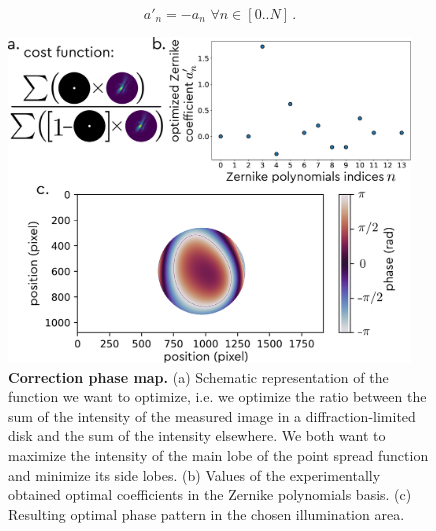 \documentclass[12pt]{iopart}
\begin{document}
\begin{equation}
  a'_n = -a_n \,\, \forall n \in [0..N]\, .
\end{equation}

\begin{figure}
  \centering
  \includegraphics[width = 0.95\textwidth]{images/Zernike_1.pdf}
  \caption{
    \textbf{Correction phase map.}
    (a) Schematic representation of the function we want to optimize, 
    i.e. we optimize the ratio between 
    the sum of the intensity of the measured image in a diffraction-limited disk
    and the sum of the intensity elsewhere.    
    We both want to maximize the intensity of the main lobe of the point spread function
    and minimize its side lobes.
    (b) Values of the experimentally obtained optimal coefficients in the Zernike polynomials basis.
    (c) Resulting optimal phase pattern in the chosen illumination area.
  }
  \label{fig:phase_corr}
\end{figure}
\end{document}
